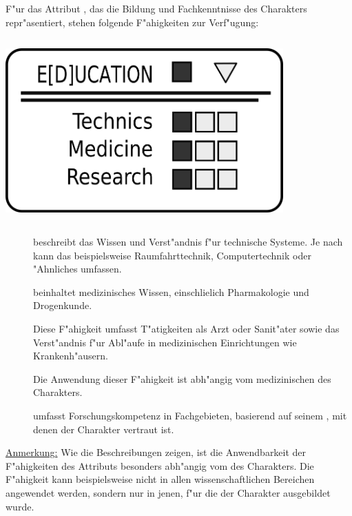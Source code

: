 \medskip
\begin{column}[l]{0.55}
    F"ur das Attribut , das die Bildung und Fachkenntnisse des Charakters repr"asentiert, stehen folgende F"ahigkeiten zur Verf"ugung:

\end{column}
\begin{column}[r]{0.45}
    \centering
    \includegraphics[width=0.80\textwidth]{images/character_education.png}
\end{column}

\begin{description}
    \item[]  beschreibt das Wissen und Verst"andnis f"ur technische Systeme. Je nach  kann das beispielsweise Raumfahrttechnik, Computertechnik oder "Ahnliches umfassen.
    \item[]  beinhaltet medizinisches Wissen, einschlie\3lich Pharmakologie und Drogenkunde. 
    
        Diese F"ahigkeit umfasst T"atigkeiten als Arzt oder Sanit"ater sowie das Verst"andnis f"ur Abl"aufe in medizinischen Einrichtungen wie Krankenh"ausern. 
        
        Die Anwendung dieser F"ahigkeit ist abh"angig vom medizinischen  des Charakters.
    \item[]  umfasst Forschungskompetenz in Fachgebieten, basierend auf seinem , mit denen 
        der Charakter vertraut ist.
\end{description}

\underline{Anmerkung:} Wie die Beschreibungen zeigen, ist die Anwendbarkeit der F"ahigkeiten des Attributs  besonders abh"angig vom  des Charakters. Die F"ahigkeit  kann beispielsweise nicht in allen wissenschaftlichen Bereichen angewendet werden, sondern nur in jenen, f"ur die der Charakter ausgebildet wurde.

